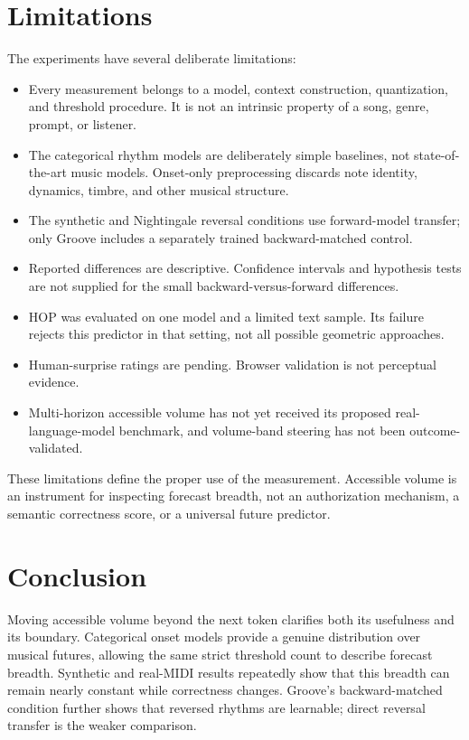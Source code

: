 \documentclass[11pt,a4paper]{article}
\begin{document}
\section{Limitations}
The experiments have several deliberate limitations:
\begin{itemize}[nosep]
  \item Every measurement belongs to a model, context construction, quantization, and threshold procedure. It is not an intrinsic property of a song, genre, prompt, or listener.
  \item The categorical rhythm models are deliberately simple baselines, not state-of-the-art music models. Onset-only preprocessing discards note identity, dynamics, timbre, and other musical structure.
  \item The synthetic and Nightingale reversal conditions use forward-model transfer; only Groove includes a separately trained backward-matched control.
  \item Reported differences are descriptive. Confidence intervals and hypothesis tests are not supplied for the small backward-versus-forward differences.
  \item HOP was evaluated on one model and a limited text sample. Its failure rejects this predictor in that setting, not all possible geometric approaches.
  \item Human-surprise ratings are pending. Browser validation is not perceptual evidence.
  \item Multi-horizon accessible volume has not yet received its proposed real-language-model benchmark, and volume-band steering has not been outcome-validated.
\end{itemize}
These limitations define the proper use of the measurement. Accessible volume is an instrument for inspecting forecast breadth, not an authorization mechanism, a semantic correctness score, or a universal future predictor.

\section{Conclusion}
Moving accessible volume beyond the next token clarifies both its usefulness and its boundary. Categorical onset models provide a genuine distribution over musical futures, allowing the same strict threshold count to describe forecast breadth. Synthetic and real-MIDI results repeatedly show that this breadth can remain nearly constant while correctness changes. Groove's backward-matched condition further shows that reversed rhythms are learnable; direct reversal transfer is the weaker comparison.
\end{document}

